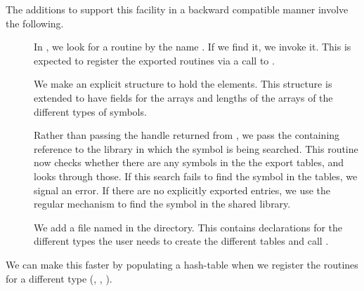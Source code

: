 \documentclass{article}
\begin{document}
The additions to support this facility in a backward compatible
manner involve the following.
\begin{description}
\item[] In , we look for a routine by the name
  .  If we find it, we invoke it. This
  is expected to register the exported routines via a call to
  .

\item[]
  We make an explicit structure to hold the 
elements. This structure is extended to have
fields for the arrays and lengths of the arrays of
the different types of symbols.

\item[]

  Rather than passing the handle returned from , we
  pass the containing  reference to the library in
  which the symbol is being searched. This routine now checks
  whether there are any symbols in the the export tables,
  and looks through those.
  If this search fails to find the symbol in the tables,
   we signal an error.
   If there are no explicitly exported entries,
   we use the regular
  mechanism to find the symbol in the shared library.
  
  
\item[] We add a file named  in the
   directory.  This contains declarations for the
  different types the user needs to create the different tables and
  call .

\end{description}

We can make this faster by populating a hash-table when we register the
routines for a different type (, ,
).
\end{document}
